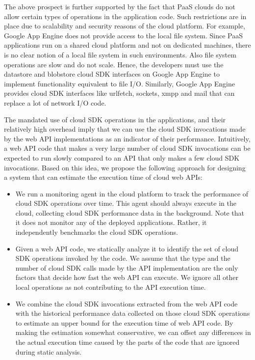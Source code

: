 The above prospect is further supported by the fact that PaaS clouds do not allow 
certain types of operations in the application code. Such restrictions are in place
due to scalability and security reasons of the cloud platform. For example, Google App Engine
does not provide access to the local file system. Since PaaS applications run on a shared cloud
platform and not on dedicated machines, there is no clear notion of a local file system in such environments.
Also file system operations are slow and do not scale.
Hence, the developers must use the datastore and blobstore cloud SDK interfaces on Google App
Engine to implement functionality equivalent to file I/O. Similarly, Google App Engine provides cloud SDK
interfaces like urlfetch, sockets, xmpp and mail that can replace a lot of network I/O code.

The mandated use of cloud SDK operations in the applications, and their relatively high overhead 
imply that we can use the cloud SDK
invocations made by the web API implementations as an indicator of their performance. Intuitively, a web API
code that makes a very large number of cloud SDK invocations can be expected to run slowly compared
to an API that only makes a few cloud SDK invocations. Based on this idea, we propose the following approach
for designing a system that can estimate the execution time of cloud web APIs:

\begin{itemize}
\item We run a monitoring agent in the cloud platform to track the performance of
cloud SDK operations over time. This agent should always execute in the cloud, collecting
cloud SDK performance data in the background. Note that it does not monitor any of the
deployed applications. Rather, it independently benchmarks the cloud SDK operations.
\item Given a web API code, we statically analyze it to identify the set of cloud SDK operations
invoked by the code. We assume that the type and the number of cloud SDK calls made by the API implementation
are the only factors that decide how fast the web API can execute. We ignore all other local operations
as not contributing to the API execution time.
\item We combine the cloud SDK invocations extracted from the web API code with the historical
performance data collected on those cloud SDK operations to estimate an upper bound for the
execution time of web API code. By making the estimation somewhat conservative, we can offset 
any differences in the actual execution time caused by the parts of the code that are ignored during
static analysis. 
\end{itemize}

